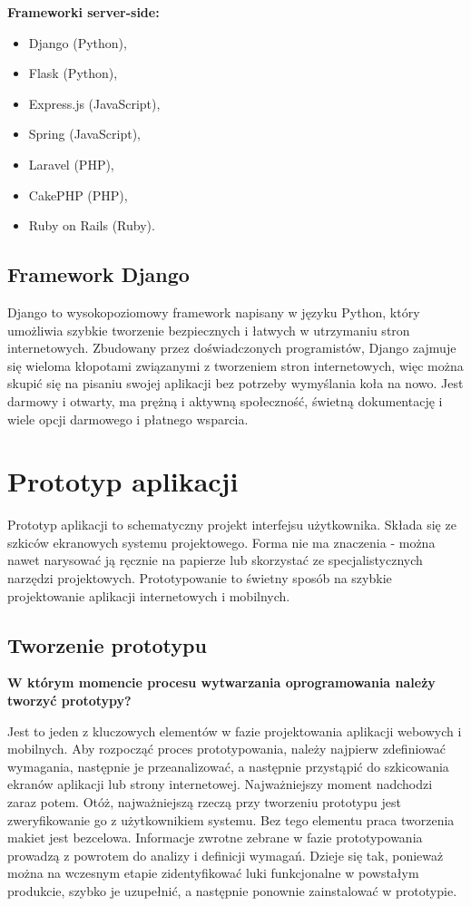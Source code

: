 \textbf{Frameworki server-side:}
\begin{itemize}
\item Django (Python),
\item Flask (Python),
\item Express.js (JavaScript),
\item Spring (JavaScript),
\item Laravel (PHP),
\item CakePHP (PHP),
\item Ruby on Rails (Ruby).
\end{itemize}

\subsection{Framework Django}

Django to wysokopoziomowy framework napisany w języku Python, który umożliwia szybkie tworzenie bezpiecznych i łatwych w utrzymaniu stron internetowych. Zbudowany przez doświadczonych programistów, Django zajmuje się wieloma kłopotami związanymi z tworzeniem stron internetowych, więc można skupić się na pisaniu swojej aplikacji bez potrzeby wymyślania koła na nowo. Jest darmowy i otwarty, ma prężną i aktywną społeczność, świetną dokumentację i wiele opcji darmowego i płatnego wsparcia.

\section{Prototyp aplikacji}

Prototyp aplikacji to schematyczny projekt interfejsu użytkownika. Składa się ze szkiców ekranowych systemu projektowego. Forma nie ma znaczenia - można nawet narysować ją ręcznie na papierze lub skorzystać ze specjalistycznych narzędzi projektowych. Prototypowanie to świetny sposób na szybkie projektowanie aplikacji internetowych i mobilnych.

\subsection{Tworzenie prototypu}

\textbf{W którym momencie procesu wytwarzania oprogramowania należy tworzyć prototypy?}

Jest to jeden z kluczowych elementów w fazie projektowania aplikacji webowych i mobilnych. Aby rozpocząć proces prototypowania, należy najpierw zdefiniować wymagania, następnie je przeanalizować, a następnie przystąpić do szkicowania ekranów aplikacji lub strony internetowej. Najważniejszy moment nadchodzi zaraz potem. Otóż, najważniejszą rzeczą przy tworzeniu prototypu jest zweryfikowanie go z użytkownikiem systemu. Bez tego elementu praca tworzenia makiet jest bezcelowa. Informacje zwrotne zebrane w fazie prototypowania prowadzą z powrotem do analizy i definicji wymagań. Dzieje się tak, ponieważ można na wczesnym etapie zidentyfikować luki funkcjonalne w powstałym produkcie, szybko je uzupełnić, a następnie ponownie zainstalować w prototypie.

